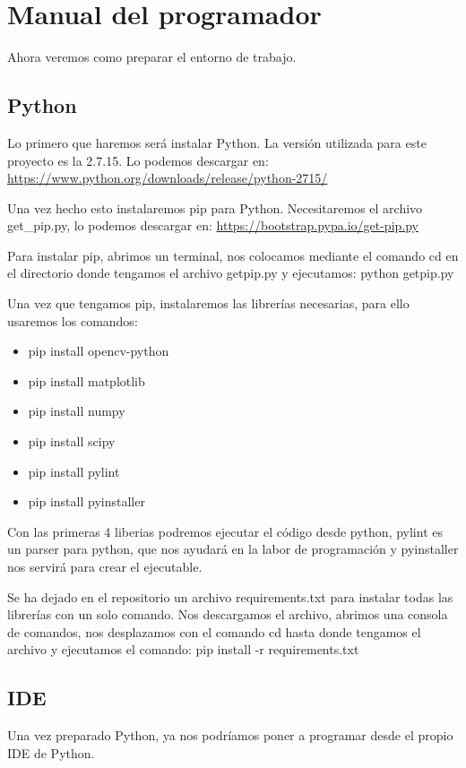 \section{Manual del programador}
Ahora veremos como preparar el entorno de trabajo.

\subsection{Python}
Lo primero que haremos será instalar Python. La versión utilizada para este proyecto es la 2.7.15.
Lo podemos descargar en:
\url{https://www.python.org/downloads/release/python-2715/}

Una vez hecho esto instalaremos pip para Python. Necesitaremos el archivo get\_pip.py, lo podemos descargar en:
\url{https://bootstrap.pypa.io/get-pip.py}

Para instalar pip, abrimos un terminal, nos colocamos mediante el comando cd en el directorio donde tengamos el archivo get\-pip.py y ejecutamos: python get\-pip.py

Una vez que tengamos pip, instalaremos las librerías necesarias, para ello usaremos los comandos:

\begin{itemize}
	\item pip install opencv-python
	\item pip install matplotlib
	\item pip install numpy
	\item pip install scipy
	\item pip install pylint
	\item pip install pyinstaller
\end{itemize}

Con las primeras 4 liberias podremos ejecutar el código desde python, pylint es un parser para python, que nos ayudará en la labor de programación y pyinstaller nos servirá para crear el ejecutable.

Se ha dejado en el repositorio un archivo requirements.txt para instalar todas las librerías con un solo comando. Nos descargamos el archivo, abrimos una consola de comandos, nos desplazamos con el comando cd hasta donde tengamos el archivo y ejecutamos el comando: pip install -r requirements.txt

\subsection{IDE}
Una vez preparado Python, ya nos podríamos poner a programar desde el propio IDE de Python. 

